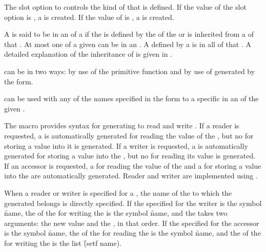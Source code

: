 The  slot option to  controls the kind
of  that is defined.  If the value of the  slot
option is , a  is created.  If the value of
 is , a  is created.

A  is said to be  in an  
of a  if
the  is defined by the  
of the  or is inherited from
a  of that .  
At most one  of a given  can be
 in an .  
A  defined by a  is
 in all  
of that .  
A detailed explanation of the inheritance of  is given in 
\secref\SlotInheritance.

\endsubSection%

 can be  in two ways: by use of the primitive function
 and by use of  generated by
the  form.

 can be used with any of the 
names specified in the  form to  a specific
  in an  of the given .

The macro  provides syntax for generating  to
read and write .  If a reader  is requested, 
a  is automatically generated for reading the value of the
, but no  for storing a value into it is generated.
If a writer  is requested, a  is automatically 
generated for storing a value into the , but no  
for reading its value is generated.  If an accessor  is 
requested, a  for reading the value of the  and a
 for storing a value into the  are automatically
generated.  Reader and writer  are implemented using
.

When a reader or writer  is specified for a , the
name of the  to which the generated 
belongs is directly specified.  If the  specified for the writer
 is the symbol \f{name}, the  of the
 for writing the  is the symbol
\f{name}, and the  takes two arguments: the new
value and the , in that order.  If the  specified
for the accessor  is the symbol \f{name}, the  of
the  for reading the  is the symbol 
\f{name}, and the  of the  for writing 
the  is the list \f{(setf name)}.

